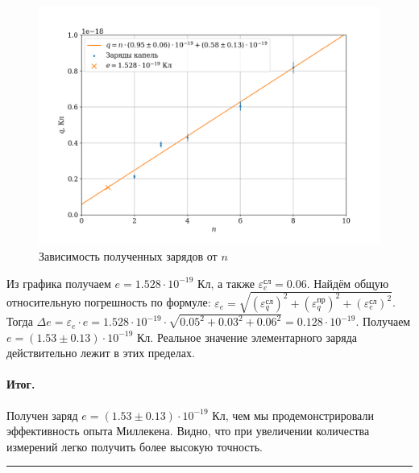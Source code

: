 \documentclass[a4paper,12pt]{article} %
\begin{document}
\begin{figure}[h]
\centering
\includegraphics[width=\textwidth]{plot1.png}
\caption{Зависимость полученных зарядов от $n$}
\label{plot1}
\end{figure} 

Из графика получаем $e = 1.528 \cdot 10^{-19}$ Кл, а также $\varepsilon_e^\text{сл} = 0.06$. Найдём общую относительную погрешность по формуле: $\varepsilon_e = \sqrt{(\varepsilon_q^\text{сл})^2 + (\varepsilon_q^\text{пр})^2 + (\varepsilon_e^\text{сл})^2}$. Тогда $\Delta e = \varepsilon_e \cdot e = 1.528 \cdot 10^{-19} \cdot \sqrt{0.05^2 + 0.03^2 + 0.06^2} = 0.128 \cdot 10^{-19}$. Получаем $e = (1.53 \pm 0.13) \cdot 10^{-19}$ Кл. Реальное значение элементарного заряда действительно лежит в этих пределах.


\paragraph{Итог.} Получен заряд $e = (1.53 \pm 0.13) \cdot 10^{-19}$ Кл, чем мы продемонстрировали эффективность опыта Миллекена. Видно, что при увеличении количества измерений легко получить более высокую точность.


\medskip\hrule\medskip
\end{document}
